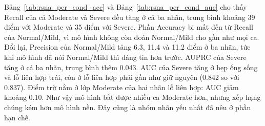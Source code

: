 \begin{table}[htbp]
\centering
\caption{Chi tiết theo điều kiện và mức độ trên RSNA, một lần chạy đại diện, phần AUC và AUPRC. So SpineNetV2 với Hybrid.}
\label{tab:rsna_per_cond_auc}
\renewcommand{\arraystretch}{1.2}
\setlength{\tabcolsep}{4pt}
\end{table}

Bảng~\ref{tab:rsna_per_cond_acc} và Bảng~\ref{tab:rsna_per_cond_auc} cho thấy Recall của cả Moderate và Severe đều tăng ở cả ba nhãn, trung bình khoảng 39 điểm với Moderate và 35 điểm với Severe. Phần Accuracy bị mất đến từ Recall của Normal/Mild, vì mô hình không còn đoán Normal/Mild cho gần như mọi ca. Đổi lại, Precision của Normal/Mild tăng 6.3, 11.4 và 11.2 điểm ở ba nhãn, tức khi mô hình đã nói Normal/Mild thì đáng tin hơn trước. AUPRC của Severe tăng ở cả ba nhãn, trung bình thêm 0.043. AUC của Severe tăng ở hẹp ống sống và lỗ liên hợp trái, còn ở lỗ liên hợp phải gần như giữ nguyên (0.842 so với 0.837). Điểm trừ nằm ở lớp Moderate của hai nhãn lỗ liên hợp: AUC giảm khoảng 0.10. Như vậy mô hình bắt được nhiều ca Moderate hơn, nhưng xếp hạng chúng kém hơn mô hình nền. Đây cũng là nhóm nhãn yếu nhất đã nêu ở phần hạn chế.


